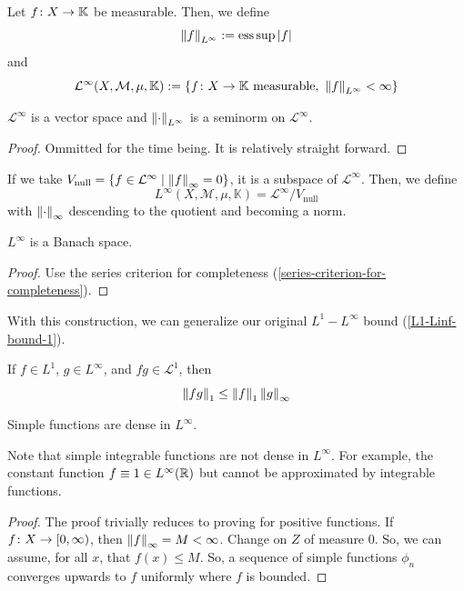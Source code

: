 \documentclass[11pt,leqno,oneside]{amsbook}
\numberwithin{thm}{section}
\newcommand{\M}{\mathcal{M}}
\newcommand{\cL}{\mathcal{L}}
\newcommand{\K}{\mathbb{K}} %
\newcommand{\ess}{\operatorname{ess}}
\begin{document}
\begin{defn}
  Let \(f \from X \to \K\) be measurable. Then, we define \[
    \norm[f]_{L^\infty} := \ess \sup |f|
  \]
  and \[\cL^\infty(X,\M,\mu,\K) := \{f \from X \to \K \text{
      measurable},\ \norm[f]_{L^\infty} < \infty\}\]
\end{defn}
\begin{prop}
  \(\cL^\infty\) is a vector space and \(\norm_{L^\infty}\) is a
  seminorm on \(\cL^\infty\).
\end{prop}
\begin{proof}
  Ommitted for the time being. It is relatively straight forward.
\end{proof}
\begin{defn}
  If we take \(V_\text{null} = \{f \in \cL^\infty \st \norm[f]_\infty
  = 0\}\), it is a subspace of \(\cL^\infty\). Then, we define \[
    L^\infty(X,\M,\mu,\K) = \cL^\infty / V_\text{null}
  \]
  with \(\norm_\infty\) descending to the quotient and becoming a norm.
\end{defn}
\begin{thm}
  \(L^\infty\) is a Banach space.
\end{thm}
\begin{proof}
  Use the series criterion for completeness
  (\ref{series-criterion-for-completeness}). 
\end{proof}
With this construction, we can generalize our original
\(L^1-L^\infty\) bound (\ref{L1-Linf-bound-1}). 
\begin{prop}
  If \(f \in L^1\), \(g \in L^\infty\), and \(fg \in \cL^1\), then \[
    \norm[fg]_1 \leq \norm[f]_1 \norm[g]_\infty
  \]
\end{prop}
\begin{thm}
  Simple functions are dense in \(L^\infty\).
\end{thm}
\begin{rmk}
  Note that simple integrable functions are not dense in
  \(L^\infty\). For example, the constant function \(f \equiv 1 \in
  L^\infty(\R)\) but cannot be approximated by integrable functions.
\end{rmk}
\begin{proof}
  The proof trivially reduces to proving for positive functions. If
  \(f \from X \to [0,\infty)\), then \(\norm[f]_\infty = M <
  \infty\). Change on \(Z\) of measure 0. So, we can assume, for all
  \(x\), that \(f(x) \leq M\). So, a sequence of simple functions
  \(\phi_n\) converges upwards to \(f\) uniformly where \(f\) is bounded.
\end{proof}
\end{document}
